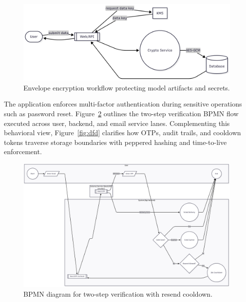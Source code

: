 \documentclass[conference]{IEEEtran}
\begin{document}
\begin{figure}[t]
  \centering
  \includegraphics[width=0.9\linewidth]{envelope_encryption_workflow.png}
  \caption{Envelope encryption workflow protecting model artifacts and secrets.}
  \label{fig:encryption}
\end{figure}

The application enforces multi-factor authentication during sensitive operations such as password reset. Figure~\ref{fig:bpmn} outlines the two-step verification BPMN flow executed across user, backend, and email service lanes. Complementing this behavioral view, Figure~\ref{fig:dfd} clarifies how OTPs, audit trails, and cooldown tokens traverse storage boundaries with peppered hashing and time-to-live enforcement.

\begin{figure}[t]
  \centering
  \includegraphics[width=0.9\linewidth]{bpmn_for_two_step_verification.png}
  \caption{BPMN diagram for two-step verification with resend cooldown.}
  \label{fig:bpmn}
\end{figure}
\end{document}
